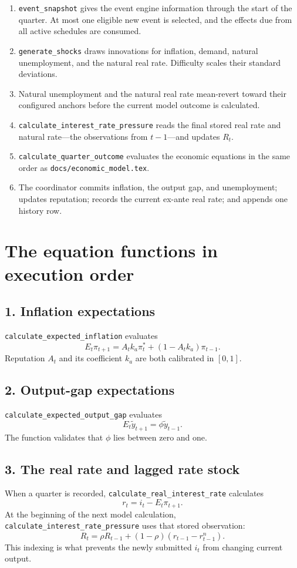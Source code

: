 \documentclass[11pt]{article}
\newcommand{\code}[1]{\texttt{#1}}
\newcommand{\gap}{\widetilde y}
\begin{document}
\begin{enumerate}
  \item \code{event\_snapshot} gives the event engine information through the
  start of the quarter.  At most one eligible new event is selected, and the
  effects due from all active schedules are consumed.
  \item \code{generate\_shocks} draws innovations for inflation, demand,
  natural unemployment, and the natural real rate.  Difficulty scales their
  standard deviations.
  \item Natural unemployment and the natural real rate mean-revert toward
  their configured anchors before the current model outcome is calculated.
  \item \code{calculate\_interest\_rate\_pressure} reads the final stored real
  rate and natural rate---the observations from $t-1$---and updates $R_t$.
  \item \code{calculate\_quarter\_outcome} evaluates the economic equations in
  the same order as \code{docs/economic\_model.tex}.
  \item The coordinator commits inflation, the output gap, and unemployment;
  updates reputation; records the current ex-ante real rate; and appends one
  history row.
\end{enumerate}

\section{The equation functions in execution order}

\subsection*{1. Inflation expectations}
\code{calculate\_expected\_inflation} evaluates
\[
 E_t\pi_{t+1}=A_tk_a\pi_t^*+(1-A_tk_a)\pi_{t-1}.
\]
Reputation $A_t$ and its coefficient $k_a$ are both calibrated in $[0,1]$.

\subsection*{2. Output-gap expectations}
\code{calculate\_expected\_output\_gap} evaluates
\[
 E_t\gap_{t+1}=\phi\gap_{t-1}.
\]
The function validates that $\phi$ lies between zero and one.

\subsection*{3. The real rate and lagged rate stock}
When a quarter is recorded, \code{calculate\_real\_interest\_rate} calculates
\[
 r_t=i_t-E_t\pi_{t+1}.
\]
At the beginning of the next model calculation,
\code{calculate\_interest\_rate\_pressure} uses that stored observation:
\[
 R_t=\rho R_{t-1}+(1-\rho)(r_{t-1}-r^n_{t-1}).
\]
This indexing is what prevents the newly submitted $i_t$ from changing current
output.
\end{document}
